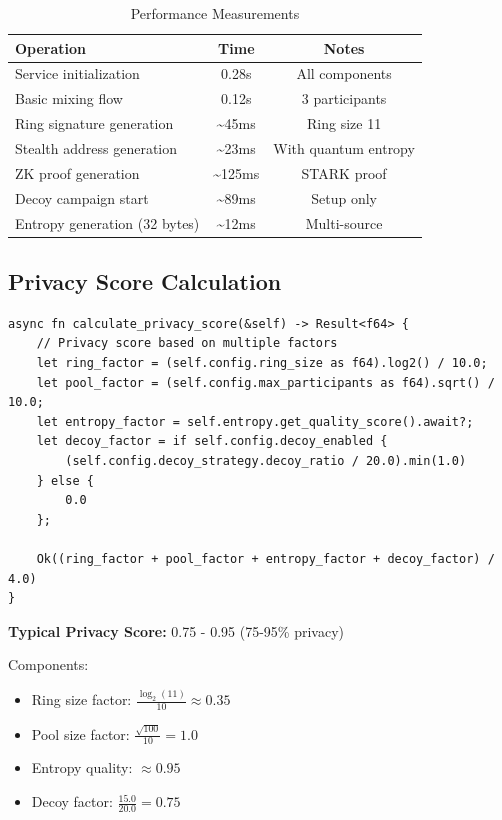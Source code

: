 \documentclass[12pt,a4paper]{article}
\begin{document}
\begin{table}[h]
\centering
\begin{tabular}{lcc}
\toprule
Operation & Time & Notes \\
\midrule
Service initialization & 0.28s & All components \\
Basic mixing flow & 0.12s & 3 participants \\
Ring signature generation & \textasciitilde 45ms & Ring size 11 \\
Stealth address generation & \textasciitilde 23ms & With quantum entropy \\
ZK proof generation & \textasciitilde 125ms & STARK proof \\
Decoy campaign start & \textasciitilde 89ms & Setup only \\
Entropy generation (32 bytes) & \textasciitilde 12ms & Multi-source \\
\bottomrule
\end{tabular}
\caption{Performance Measurements}
\end{table}

\subsection{Privacy Score Calculation}

\begin{lstlisting}[style=rustcode, caption=Privacy Score Computation]
async fn calculate_privacy_score(&self) -> Result<f64> {
    // Privacy score based on multiple factors
    let ring_factor = (self.config.ring_size as f64).log2() / 10.0;
    let pool_factor = (self.config.max_participants as f64).sqrt() / 10.0;
    let entropy_factor = self.entropy.get_quality_score().await?;
    let decoy_factor = if self.config.decoy_enabled {
        (self.config.decoy_strategy.decoy_ratio / 20.0).min(1.0)
    } else {
        0.0
    };

    Ok((ring_factor + pool_factor + entropy_factor + decoy_factor) / 4.0)
}
\end{lstlisting}

\textbf{Typical Privacy Score:} 0.75 - 0.95 (75-95\% privacy)

Components:
\begin{itemize}
\item Ring size factor: $\frac{\log_2(11)}{10} \approx 0.35$
\item Pool size factor: $\frac{\sqrt{100}}{10} = 1.0$
\item Entropy quality: $\approx 0.95$
\item Decoy factor: $\frac{15.0}{20.0} = 0.75$
\end{itemize}
\end{document}
